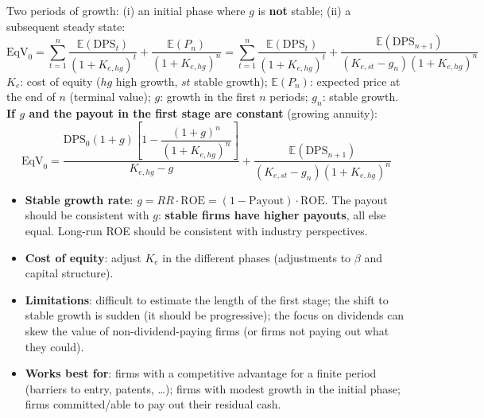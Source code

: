 \begin{keybox}
Two periods of growth: (i) an initial phase where $g$ is \textbf{not} stable; (ii) a subsequent steady state:
\[
\text{EqV}_0=\sum_{t=1}^{n}\frac{\mathbb{E}(\text{DPS}_t)}{(1+K_{e,hg})^t}+\frac{\mathbb{E}(P_n)}{(1+K_{e,hg})^n}=\sum_{t=1}^{n}\frac{\mathbb{E}(\text{DPS}_t)}{(1+K_{e,hg})^t}+\frac{\mathbb{E}(\text{DPS}_{n+1})}{(K_{e,st}-g_n)(1+K_{e,hg})^n}
\]
$K_e$: cost of equity ($hg$ high growth, $st$ stable growth); $\mathbb{E}(P_n)$: expected price at the end of $n$ (terminal value); $g$: growth in the first $n$ periods; $g_n$: stable growth.\\[4pt]
\textbf{If $g$ and the payout in the first stage are constant} (growing annuity):
\[
\text{EqV}_0=\frac{\text{DPS}_0(1+g)\left[1-\dfrac{(1+g)^n}{(1+K_{e,hg})^n}\right]}{K_{e,hg}-g}+\frac{\mathbb{E}(\text{DPS}_{n+1})}{(K_{e,st}-g_n)(1+K_{e,hg})^n}
\]
\end{keybox}
\begin{itemize}
  \item \textbf{Stable growth rate}: $g=RR\cdot\text{ROE}=(1-\text{Payout})\cdot\text{ROE}$. The payout should be consistent with $g$: \textbf{stable firms have higher payouts}, all else equal. Long-run ROE should be consistent with industry perspectives.
  \item \textbf{Cost of equity}: adjust $K_e$ in the different phases (adjustments to $\beta$ and capital structure).
  \item \textbf{Limitations}: difficult to estimate the length of the first stage; the shift to stable growth is sudden (it should be progressive); the focus on dividends can skew the value of non-dividend-paying firms (or firms not paying out what they could).
  \item \textbf{Works best for}: firms with a competitive advantage for a finite period (barriers to entry, patents, \dots); firms with modest growth in the initial phase; firms committed/able to pay out their residual cash.
\end{itemize}

